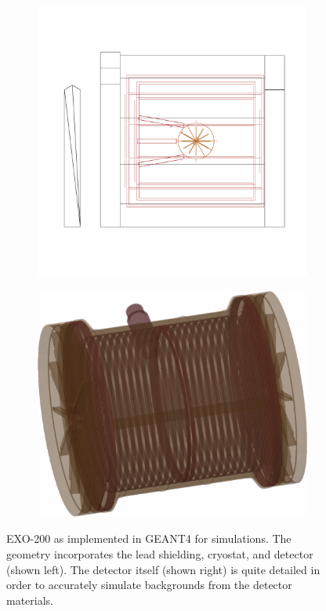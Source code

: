 \documentclass[herrin-thesis.tex]{subfiles}
\begin{document}
\begin{figure}[htb]
\centering
	\begin{subfigure}[c]{0.58\textwidth}
	\centering
	\includegraphics[width=\textwidth]{./plots/analysis_geant4_geometry_cropped.pdf}
	\end{subfigure}\hfill%
	\begin{subfigure}[c]{0.38\textwidth}
	\centering
	\includegraphics[width=\textwidth]{./photos/analysis_geant4_TPC_cropped.png}
	\end{subfigure}
\caption[EXO-200 geometry simulated in GEANT4]{EXO-200 as implemented in GEANT4 for simulations. The geometry incorporates the lead shielding, cryostat, and detector (shown left). The detector itself (shown right) is quite detailed in order to accurately simulate backgrounds from the detector materials.}
\label{fig:analysis_geant4_detector}
\end{figure}
\end{document}
